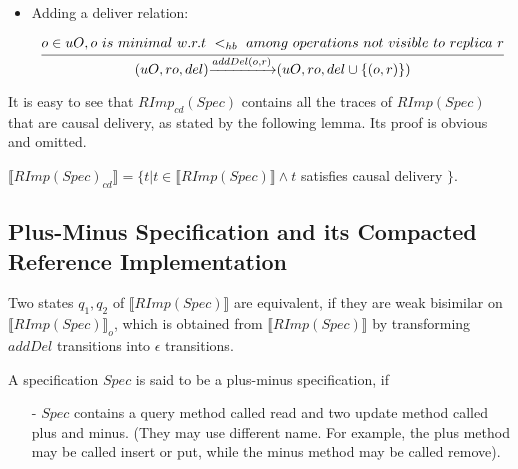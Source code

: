 {\begin {itemize}
\setlength{\itemsep}{0.5pt}
\item[-] Adding a deliver relation:

$\begin{array}{l c} \bigfrac{o \in uO, o \ is \ minimal \ w.r.t \ <_{hb} \ among \ operations \ not \ visible \ to \ replica \ r} {(uO,ro,del) {\xrightarrow{addDel(o,r)}} (uO,ro,del \cup \{ (o,r) \})} \end{array}$

\end{itemize}

It is easy to see that $RImp_{cd}(Spec)$ contains all the traces of $RImp(Spec)$ that are causal delivery, as stated by the following lemma. Its proof is obvious and omitted.

\begin{lemma}
\label{lemma:RImpcdSpec contains all the traces of RImpSpec that are causal delivery}

$\llbracket RImp(Spec)_{cd} \rrbracket = \{ t \vert t \in \llbracket RImp(Spec) \rrbracket \wedge t$ satisfies causal delivery $\}$.
\end{lemma}



\subsection{Plus-Minus Specification and its Compacted Reference Implementation}
\label{subsec:plus-minus specification and its compacted reference implementation}


Two states $q_1,q_2$ of $\llbracket RImp(Spec) \rrbracket$ are equivalent, if they are weak bisimilar on $\llbracket RImp(Spec) \rrbracket_o$, which is obtained from $\llbracket RImp(Spec) \rrbracket$ by transforming $addDel$ transitions into $\epsilon$ transitions.

A specification $Spec$ is said to be a plus-minus specification, if

\begin{itemize}
\setlength{\itemsep}{0.5pt}
\item[-] $Spec$ contains a query method called read and two update method called plus and minus. (They may use different name. For example, the plus method may be called insert or put, while the minus method may be called remove).


\end{itemize}}
